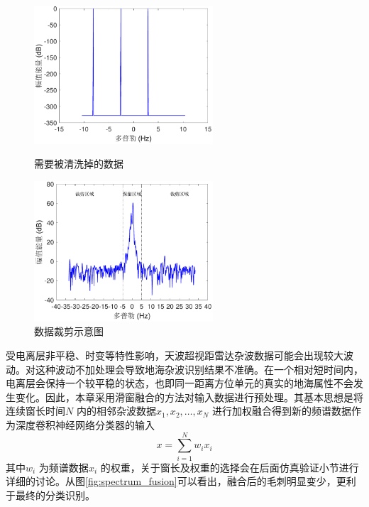 \begin{figure}[H]
	\centering
	\begin{minipage}{7cm}
		\includegraphics[width=6.67cm]{figures/othr/delete}
		\caption{需要被清洗掉的数据}
		\label{fig:delete}

	\end{minipage}
	\hspace{10pt}
	\begin{minipage}{7cm}
		\includegraphics[width=6.67cm]{figures/othr/cut}
		\caption{数据裁剪示意图}
		\label{fig:cut}

	\end{minipage}

\end{figure}

受电离层非平稳、时变等特性影响，天波超视距雷达杂波数据可能会出现较大波动。对这种波动不加处理会导致地海杂波识别结果不准确。在一个相对短时间内，电离层会保持一个较平稳的状态，也即同一距离方位单元的真实的地海属性不会发生变化。因此，本章采用滑窗融合的方法对输入数据进行预处理。其基本思想是将连续窗长时间$N$ 内的相邻杂波数据$x_1,x_2,\dots,x_N$ 进行加权融合得到新的频谱数据作为深度卷积神经网络分类器的输入
\begin{equation}
	x=\sum_{i=1}^N w_ix_i
	\label{equ:window_fusion}
\end{equation}
其中$w_i$ 为频谱数据$x_i$ 的权重，关于窗长及权重的选择会在后面仿真验证小节进行详细的讨论。从图\ref{fig:spectrum_fusion}可以看出，融合后的毛刺明显变少，更利于最终的分类识别。

